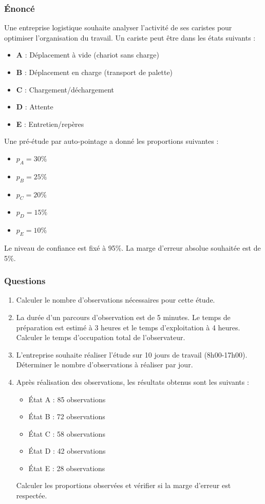 \documentclass[a4paper,12pt]{article}
\begin{document}
\subsubsection{Énoncé}

Une entreprise logistique souhaite analyser l'activité de ses caristes pour optimiser l'organisation du travail. Un cariste peut être dans les états suivants :

\begin{itemize}
    \item \textbf{A} : Déplacement à vide (chariot sans charge)
    \item \textbf{B} : Déplacement en charge (transport de palette)
    \item \textbf{C} : Chargement/déchargement
    \item \textbf{D} : Attente
    \item \textbf{E} : Entretien/repères
\end{itemize}

Une pré-étude par auto-pointage a donné les proportions suivantes :
\begin{itemize}
    \item $p_A = 30\%$
    \item $p_B = 25\%$
    \item $p_C = 20\%$
    \item $p_D = 15\%$
    \item $p_E = 10\%$
\end{itemize}

Le niveau de confiance est fixé à 95\%. La marge d'erreur absolue souhaitée est de 5\%.

\subsubsection{Questions}

\begin{enumerate}
    \item Calculer le nombre d'observations nécessaires pour cette étude.
    \item La durée d'un parcours d'observation est de 5 minutes. Le temps de préparation est estimé à 3 heures et le temps d'exploitation à 4 heures. Calculer le temps d'occupation total de l'observateur.
    \item L'entreprise souhaite réaliser l'étude sur 10 jours de travail (8h00-17h00). Déterminer le nombre d'observations à réaliser par jour.
    \item Après réalisation des observations, les résultats obtenus sont les suivants :
    \begin{itemize}
        \item État A : 85 observations
        \item État B : 72 observations
        \item État C : 58 observations
        \item État D : 42 observations
        \item État E : 28 observations
    \end{itemize}
    Calculer les proportions observées et vérifier si la marge d'erreur est respectée.
\end{enumerate}
\end{document}
